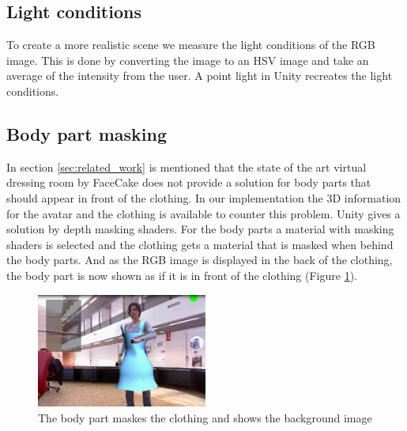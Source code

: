 \documentclass[twocolumn,a4paper]{article}
\begin{document}
\subsection{Light conditions}
\label{sec:light_conditions}
To create a more realistic scene we measure the light conditions of the RGB image. This is done by converting the image to an HSV image and take an average of the intensity from the user.
A point light in Unity recreates the light conditions.

\subsection{Body part masking}
\label{sec:bodypart_masking}
In section \ref{sec:related_work} is mentioned that the state of the art virtual dressing room by FaceCake does not provide a solution for body parts that should appear in front of the clothing. In our implementation the 3D information for the avatar and the clothing is available to counter this problem. Unity gives a solution by depth masking shaders. For the body parts a material with masking shaders is selected and the clothing gets a material that is masked when behind the body parts. And as the RGB image is displayed in the back of the clothing, the body part is now shown as if it is in front of the clothing (Figure \ref{fig:shader}).

 \begin{figure}[htp]
\centering
\includegraphics[width=0.5\textwidth]{show_shader_morris.png} 
\caption{The body part maskes the clothing and shows the background image}
\label{fig:shader}
\end{figure}
\end{document}
